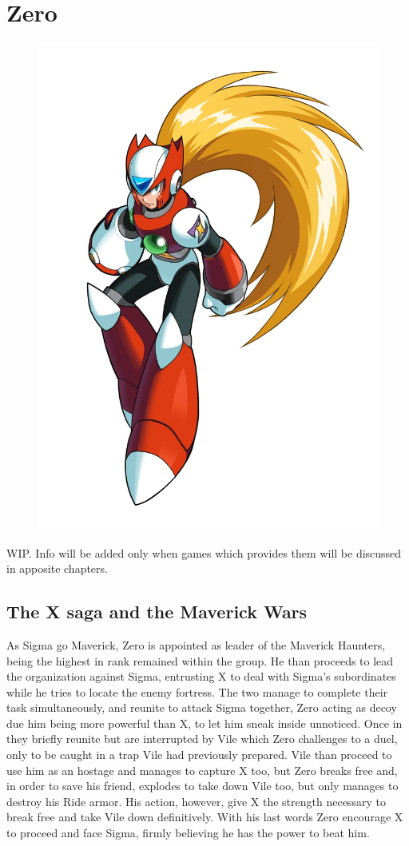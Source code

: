 \chapter{Zero}\label{char:Zero}
\begin{figure}[h]
	\centering
	\includegraphics[width=0.4\linewidth]{figures/Characters/Char_Z.png}
\end{figure}
WIP. Info will be added only when games which provides them will be discussed in apposite chapters.

\section{The X saga and the Maverick Wars}
As Sigma go Maverick, Zero is appointed as leader of the Maverick Haunters, being the highest in rank remained within the group. He than proceeds to lead the organization against Sigma, entrusting X to deal with Sigma's subordinates while he tries to locate the enemy fortress. The two manage to complete their task simultaneously, and reunite to attack Sigma together, Zero acting as decoy due him being more powerful than X, to let him sneak inside unnoticed. Once in they briefly reunite but are interrupted by Vile which Zero  challenges to a duel, only to be caught in a trap Vile had previously prepared. Vile than proceed to use him as an hostage and manages to capture X too, but Zero breaks free and, in order to save his friend, explodes to take down Vile too, but only manages to destroy his Ride armor. His action, however, give X the strength necessary to break free and take Vile down definitively. With his last words Zero encourage X to proceed and face Sigma, firmly believing he has the power to beat him.

